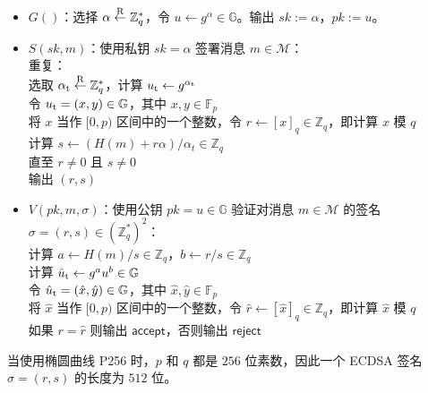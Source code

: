 \begin{itemize}
	\item $G()$：选择 $\alpha\overset{\rm R}\leftarrow\mathbb{Z}_q^*$，令 $u\leftarrow g^\alpha\in\mathbb{G}$。输出 $sk:=\alpha$，$pk:=u$。
	\item $S(sk,m)$：使用私钥 $sk=\alpha$ 签署消息 $m\in\mathcal{M}$：\\
		\hspace*{30pt} 重复：\\
		\hspace*{50pt} 选取 $\alpha_{\rm t}\overset{\rm R}\leftarrow\mathbb{Z}_q^*$，计算 $u_{\rm t}\leftarrow g^{\alpha_{\rm t}}$\\
		\hspace*{50pt} 令 $u_{\rm t}=(x,y)\in\mathbb{G}$，其中 $x,y\in\mathbb{F}_p$\\
		\hspace*{50pt} 将 $x$ 当作 $[0,p)$ 区间中的一个整数，令 $r\leftarrow[x]_q\in\mathbb{Z}_q$，即计算 $x$ 模 $q$\\
		\hspace*{50pt} 计算 $s\leftarrow\left({H(m)+r\alpha}\right)/{\alpha_t}\in\mathbb{Z}_q$\\
		\hspace*{30pt} 直至 $r\neq0$ 且 $s\neq0$\\
		\hspace*{30pt} 输出 $(r,s)$
	\item $V(pk,m,\sigma)$：使用公钥 $pk=u\in\mathbb{G}$ 验证对消息 $m\in\mathcal{M}$ 的签名 $\sigma=(r,s)\in(\mathbb{Z}_q^*)^2$：\\
		\hspace*{30pt} 计算 $a\leftarrow{H(m)}/{s}\in\mathbb{Z}_q$，$b\leftarrow{r}/{s}\in\mathbb{Z}_q$\\
		\hspace*{30pt} 计算 $\hat u_{\rm t}\leftarrow g^au^b\in\mathbb{G}$\\
		\hspace*{30pt} 令 $\hat u_{\rm t}=(\hat x,\hat y)\in\mathbb{G}$，其中 $\hat x,\hat y\in\mathbb{F}_p$\\
		\hspace*{30pt} 将 $\hat x$ 当作 $[0,p)$ 区间中的一个整数，令 $\hat r\leftarrow[\hat x]_q\in\mathbb{Z}_q$，即计算 $\hat x$ 模 $q$\\
		\hspace*{30pt} 如果 $r=\hat r$ 则输出 $\mathsf{accept}$，否则输出 $\mathsf{reject}$
\end{itemize}

当使用椭圆曲线 P256 时，$p$ 和 $q$ 都是 $256$ 位素数，因此一个 ECDSA 签名 $\sigma=(r,s)$ 的长度为 $512$ 位。

